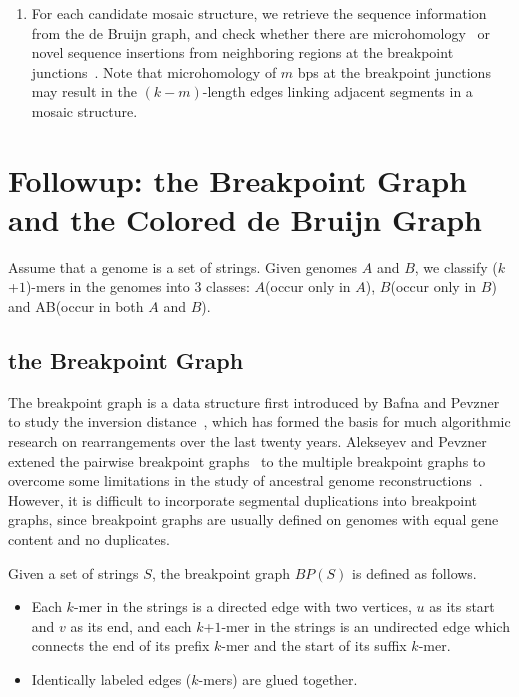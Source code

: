 \documentclass[12pt]{article}
\begin{document}
\begin{enumerate}
\item For each candidate mosaic structure, we retrieve the sequence information from the de Bruijn graph, 
and check whether there are microhomology~\cite{hastings2009microhomology} or novel sequence insertions from neighboring regions at the breakpoint junctions~\cite{liu2011chromosome}.
Note that microhomology of $m$ bps at the breakpoint junctions may result in the $(k-m)$-length edges linking adjacent segments in a mosaic structure.
\end{enumerate}


\section{Followup: the Breakpoint Graph and the Colored de Bruijn Graph}

Assume that a genome is a set of strings. Given genomes $A$ and $B$, we classify ($k$+$1$)-mers in the genomes into 3 classes: 
$A$(occur only in $A$), $B$(occur only in $B$) and AB(occur in both $A$ and $B$). 

\subsection{the Breakpoint Graph}
The breakpoint graph is a data structure first introduced by Bafna and Pevzner to study the inversion distance~\cite{bafna1993}, 
which has formed the basis for much algorithmic research on rearrangements over the last twenty years. 
Alekseyev and Pevzner extened the pairwise breakpoint graphs~\cite{bafna1993} to the multiple breakpoint graphs 
to overcome some limitations in the study of ancestral genome reconstructions~\cite{alekseyev2009}.
However, it is difficult to incorporate segmental duplications into breakpoint graphs, 
since breakpoint graphs are usually defined on genomes with equal gene content and no duplicates.

Given a set of strings $S$, the breakpoint graph $BP(S)$ is defined as follows.
\begin{itemize}
\item Each $k$-mer in the strings is a directed edge with two vertices, $u$ as its start and $v$ as its end,
and each $k$+$1$-mer in the strings is an undirected edge which connects the end of its prefix $k$-mer and the start of its suffix $k$-mer.
\item Identically labeled edges ($k$-mers) are glued together.
\end{itemize}
\end{document}
